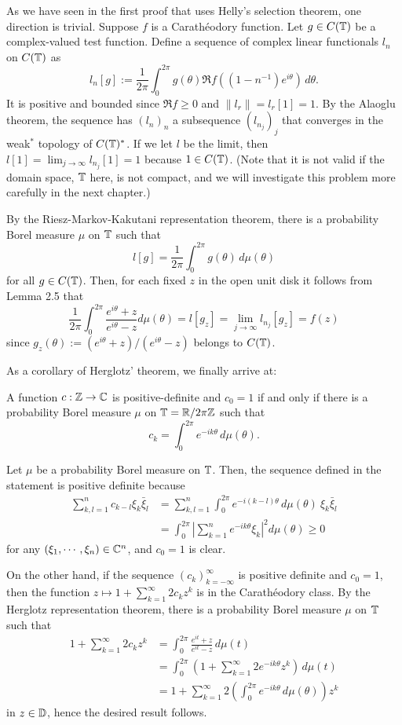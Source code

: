 \documentclass{../../small}
\begin{document}
\begin{pf}
As we have seen in the first proof that uses Helly's selection theorem, one direction is trivial.
Suppose $f$ is a Carath\'eodory function.
Let $g\in C(\mathbb{T})$ be a complex-valued test function.
Define a sequence of complex linear functionals $l_n$ on $C(\mathbb{T})$ as
\[l_n[g]:=\frac1{2\pi}\int_0^{2\pi}g(\theta)\Re f((1-n^{-1})e^{i\theta})\,d\theta.\]
It is positive and bounded since $\Re f\ge0$ and $\|l_r\|=l_r[1]=1$.
By the Alaoglu theorem, the sequence has $(l_n)_n$ a subsequence $(l_{n_j})_j$ that converges in the weak$^*$ topology of $C(\mathbb{T})^*$.
If we let $l$ be the limit, then $l[1]=\lim_{j\to\infty}l_{n_j}[1]=1$ because $1\in C(\mathbb{T})$.
(Note that it is not valid if the domain space, $\mathbb{T}$ here, is not compact, and we will investigate this problem more carefully in the next chapter.)

By the Riesz-Markov-Kakutani representation theorem, there is a probability Borel measure $\mu$ on $\mathbb{T}$ such that
\[l[g]=\frac1{2\pi}\int_0^{2\pi}g(\theta)\,d\mu(\theta)\]
for all $g\in C(\mathbb{T})$.
Then, for each fixed $z$ in the open unit disk it follows from Lemma 2.5 that
\[\frac1{2\pi}\int_0^{2\pi}\frac{e^{i\theta}+z}{e^{i\theta}-z}d\mu(\theta)=l[g_z]=\lim_{j\to\infty}l_{n_j}[g_z]=f(z)\]
since $g_z(\theta):=(e^{i\theta}+z)/(e^{i\theta}-z)$ belongs to $C(\mathbb{T})$.
\end{pf}

As a corollary of Herglotz' theorem, we finally arrive at:

\begin{cor}
A function $c:\mathbb{Z}\to\mathbb{C}$ is positive-definite and $c_0=1$ if and only if there is a probability Borel measure $\mu$ on $\mathbb{T}=\mathbb{R}/2\pi\mathbb{Z}$ such that
\[c_k=\int_0^{2\pi}e^{-ik\theta}\,d\mu(\theta).\]
\end{cor}
\begin{pf}
Let $\mu$ be a probability Borel measure on $\mathbb{T}$.
Then, the sequence defined in the statement is positive definite because
\begin{align*}
\sum_{k,l=1}^nc_{k-l}\xi_k\bar\xi_l
&=\sum_{k,l=1}^n\int_0^{2\pi}e^{-i(k-l)\theta}\,d\mu(\theta)\ \xi_k\bar\xi_l\\
&=\int_0^{2\pi}\left|\sum_{k=1}^ne^{-ik\theta}\xi_k\right|^2d\mu(\theta)\ge0
\end{align*}
for any $(\xi_1,\cdots,\xi_n)\in\mathbb{C}^n$, and $c_0=1$ is clear.

On the other hand, if the sequence $(c_k)_{k=-\infty}^\infty$ is positive definite and $c_0=1$, then the function $z\mapsto1+\sum_{k=1}^\infty2c_kz^k$ is in the Carath\'eodory class.
By the Herglotz representation theorem, there is a probability Borel measure $\mu$ on $\mathbb{T}$ such that
\begin{align*}
1+\sum_{k=1}^\infty2c_kz^k
&=\int_0^{2\pi}\frac{e^{it}+z}{e^{it}-z}\,d\mu(t)\\
&=\int_0^{2\pi}\left(1+\sum_{k=1}^\infty2e^{-ik\theta}z^k\right)\,d\mu(t)\\
&=1+\sum_{k=1}^\infty2\left(\int_0^{2\pi}e^{-ik\theta}\,d\mu(\theta)\right)z^k
\end{align*}
in $z\in\mathbb{D}$, hence the desired result follows.
\end{pf}
\end{document}
